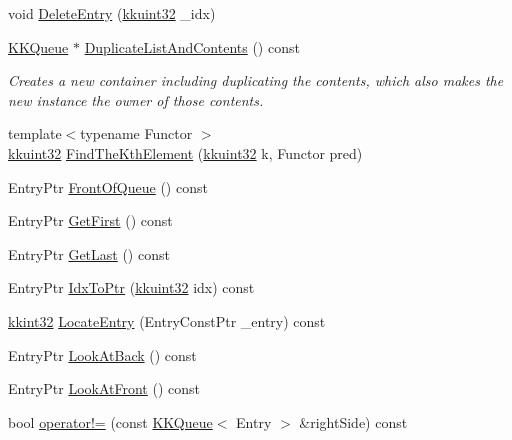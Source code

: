 \begin{DoxyCompactItemize}
\item 
void \hyperlink{class_k_k_b_1_1_k_k_queue_acc76c23f4e4e1ecddd5c82619a93d4b2}{Delete\+Entry} (\hyperlink{namespace_k_k_b_af8d832f05c54994a1cce25bd5743e19a}{kkuint32} \+\_\+idx)
\item 
\hyperlink{class_k_k_b_1_1_k_k_queue}{K\+K\+Queue} $\ast$ \hyperlink{class_k_k_b_1_1_k_k_queue_acc09d961e9f995ccf6183ff1a5e87e23}{Duplicate\+List\+And\+Contents} () const 
\begin{DoxyCompactList}\small\item\em Creates a new container including duplicating the contents, which also makes the new instance the owner of those contents. \end{DoxyCompactList}\item 
{\footnotesize template$<$typename Functor $>$ }\\\hyperlink{namespace_k_k_b_af8d832f05c54994a1cce25bd5743e19a}{kkuint32} \hyperlink{class_k_k_b_1_1_k_k_queue_a0cc98856d9a20f8838bd647e0391e6b2}{Find\+The\+Kth\+Element} (\hyperlink{namespace_k_k_b_af8d832f05c54994a1cce25bd5743e19a}{kkuint32} k, Functor pred)
\item 
Entry\+Ptr \hyperlink{class_k_k_b_1_1_k_k_queue_af449cfe0b0d33b6623949be7b7dc1103}{Front\+Of\+Queue} () const 
\item 
Entry\+Ptr \hyperlink{class_k_k_b_1_1_k_k_queue_ad194def66421c09375d6c9c900a4c6d6}{Get\+First} () const 
\item 
Entry\+Ptr \hyperlink{class_k_k_b_1_1_k_k_queue_a8cd2a0f6218ce6f63cba5c0dacf97fdf}{Get\+Last} () const 
\item 
Entry\+Ptr \hyperlink{class_k_k_b_1_1_k_k_queue_acce2bdd8b3327e38266cf198382cd852}{Idx\+To\+Ptr} (\hyperlink{namespace_k_k_b_af8d832f05c54994a1cce25bd5743e19a}{kkuint32} idx) const 
\item 
\hyperlink{namespace_k_k_b_a8fa4952cc84fda1de4bec1fbdd8d5b1b}{kkint32} \hyperlink{class_k_k_b_1_1_k_k_queue_a7605c8e51c5b1c5182482dab8226e4bc}{Locate\+Entry} (Entry\+Const\+Ptr \+\_\+entry) const 
\item 
Entry\+Ptr \hyperlink{class_k_k_b_1_1_k_k_queue_a7d818f2e1710a314f2bba035fe86dd41}{Look\+At\+Back} () const 
\item 
Entry\+Ptr \hyperlink{class_k_k_b_1_1_k_k_queue_a33e29d962c414c890db00f8c25224a82}{Look\+At\+Front} () const 
\item 
bool \hyperlink{class_k_k_b_1_1_k_k_queue_a5960ccd8db282fcb7955852e755baa14}{operator!=} (const \hyperlink{class_k_k_b_1_1_k_k_queue}{K\+K\+Queue}$<$ Entry $>$ \&right\+Side) const 

\end{DoxyCompactItemize}
